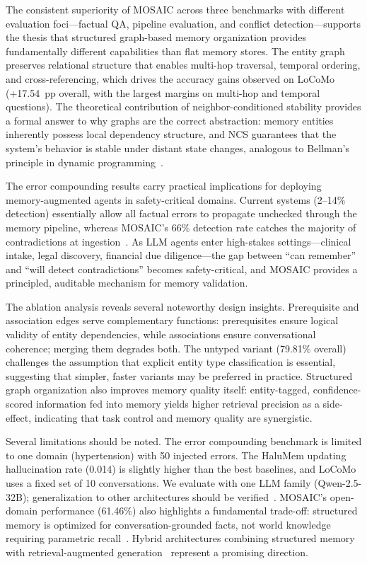 \documentclass[10pt,twocolumn]{article}
\begin{document}
The consistent superiority of MOSAIC across three benchmarks with different evaluation foci---factual QA, pipeline evaluation, and conflict detection---supports the thesis that structured graph-based memory organization provides fundamentally different capabilities than flat memory stores. The entity graph preserves relational structure that enables multi-hop traversal, temporal ordering, and cross-referencing, which drives the accuracy gains observed on LoCoMo (+17.54~pp overall, with the largest margins on multi-hop and temporal questions). The theoretical contribution of neighbor-conditioned stability provides a formal answer to why graphs are the correct abstraction: memory entities inherently possess local dependency structure, and NCS guarantees that the system's behavior is stable under distant state changes, analogous to Bellman's principle in dynamic programming~\citep{bellman1966dynamic}.

The error compounding results carry practical implications for deploying memory-augmented agents in safety-critical domains. Current systems (2--14\% detection) essentially allow all factual errors to propagate unchecked through the memory pipeline, whereas MOSAIC's 66\% detection rate catches the majority of contradictions at ingestion~\citep{huang2025survey}. As LLM agents enter high-stakes settings---clinical intake, legal discovery, financial due diligence---the gap between ``can remember'' and ``will detect contradictions'' becomes safety-critical, and MOSAIC provides a principled, auditable mechanism for memory validation.

The ablation analysis reveals several noteworthy design insights. Prerequisite and association edges serve complementary functions: prerequisites ensure logical validity of entity dependencies, while associations ensure conversational coherence; merging them degrades both. The untyped variant (79.81\% overall) challenges the assumption that explicit entity type classification is essential, suggesting that simpler, faster variants may be preferred in practice. Structured graph organization also improves memory quality itself: entity-tagged, confidence-scored information fed into memory yields higher retrieval precision as a side-effect, indicating that task control and memory quality are synergistic.

Several limitations should be noted. The error compounding benchmark is limited to one domain (hypertension) with 50 injected errors. The HaluMem updating hallucination rate (0.014) is slightly higher than the best baselines, and LoCoMo uses a fixed set of 10 conversations. We evaluate with one LLM family (Qwen-2.5-32B); generalization to other architectures should be verified~\citep{touvron2023llama, achiam2023gpt}. MOSAIC's open-domain performance (61.46\%) also highlights a fundamental trade-off: structured memory is optimized for conversation-grounded facts, not world knowledge requiring parametric recall~\citep{liu2024lost}. Hybrid architectures combining structured memory with retrieval-augmented generation~\citep{lewis2020retrieval, gao2023retrieval} represent a promising direction.
\end{document}
